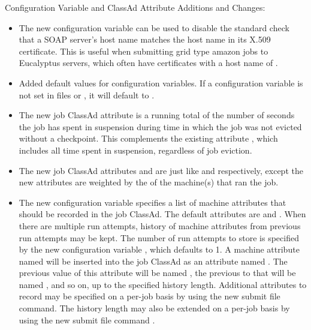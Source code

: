 \noindent Configuration Variable and ClassAd Attribute Additions and Changes:

\begin{itemize}

\item The new configuration variable 
can be used to disable the standard check that a SOAP server's host name
matches the host name in its X.509 certificate. This is useful when submitting
grid type amazon jobs to Eucalyptus servers, which often have certificates
with a host name of .

\item Added default values for  configuration variables.
  If a  configuration variable is not set in 
  files  or ,
  it will default to .

\item The new job ClassAd attribute 
is a running total of the number of seconds the job has spent in
suspension during time in which the job was not evicted without a
checkpoint.  This complements the existing attribute
, which includes all time spent in
suspension, regardless of job eviction.

\item The new job ClassAd attributes  and
 are just like  and
 respectively, except the new attributes
are weighted by the  of the machine(s) that ran
the job.

\item The new configuration variable
 specifies a list of machine
attributes that should be recorded in the job ClassAd.  The default
attributes are  and .  When there are
multiple run attempts, history of machine attributes from previous
run attempts may be kept.  The number of run attempts to store is
specified by the new configuration variable
, which defaults
to 1.  A machine attribute named  will be inserted into the
job ClassAd as an attribute named .  The previous
value of this attribute will be named , the
previous to that will be named , and so on, up to
the specified history length.  Additional attributes to record may be
specified on a per-job basis by using the new 
submit file command.  The history length may also be extended on a
per-job basis by using the new submit file command
.


\end{itemize}
